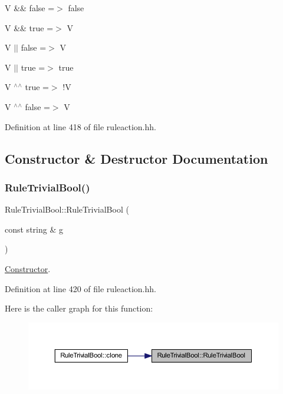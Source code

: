 \begin{DoxyItemize}
\item {\ttfamily V \&\& false =$>$ false}
\item {\ttfamily V \&\& true =$>$ V}
\item {\ttfamily V $\vert$$\vert$ false =$>$ V}
\item {\ttfamily V $\vert$$\vert$ true =$>$ true}
\item {\ttfamily V $^\wedge$$^\wedge$ true =$>$ !V}
\item {\ttfamily V $^\wedge$$^\wedge$ false =$>$ V} 
\end{DoxyItemize}

Definition at line 418 of file ruleaction.\+hh.



\subsection{Constructor \& Destructor Documentation}
\mbox{\label{class_rule_trivial_bool_a8a079f95121a49bd16ee55cc618c0a07}} 
\subsubsection{\texorpdfstring{RuleTrivialBool()}{RuleTrivialBool()}}
{\footnotesize\ttfamily Rule\+Trivial\+Bool\+::\+Rule\+Trivial\+Bool (\begin{DoxyParamCaption}\item[{const string \&}]{g }\end{DoxyParamCaption})\hspace{0.3cm}{\ttfamily [inline]}}



\mbox{\hyperlink{class_constructor}{Constructor}}. 



Definition at line 420 of file ruleaction.\+hh.

Here is the caller graph for this function\+:
\nopagebreak
\begin{figure}[H]
\begin{center}
\leavevmode
\includegraphics[width=350pt]{class_rule_trivial_bool_a8a079f95121a49bd16ee55cc618c0a07_icgraph}
\end{center}
\end{figure}


